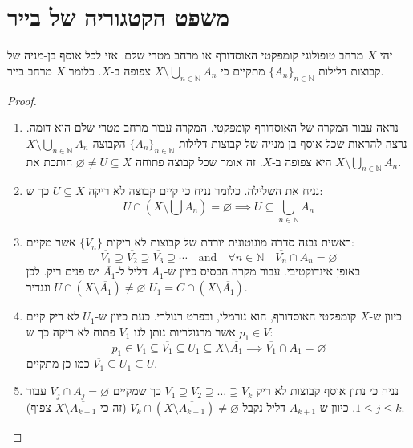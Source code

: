 \documentclass{tstextbook}
\begin{document}
\section{משפט הקטגוריה של בייר}

\begin{theorem}
יהי \(X\) מרחב טופולוגי קומפקטי האוסדורף או מרחב מטרי שלם.
אזי לכל אוסף בן-מניה של קבוצות דלילות \(\{A_{n}\}_{n\in\mathbb{N}}\) מתקיים כי \(X\setminus\bigcup_{n\in\mathbb{N}}A_{n}\) צפופה ב-\(X\). כלומר \(X\) מרחב בייר.

\end{theorem}
\begin{proof}
  \begin{enumerate}
    \item נראה עבור המקרה של האוסדורף קומפקטי. המקרה עבור מרחב מטרי שלם הוא דומה. נרצה להראות שכל אוסף בן מנייה של קבוצות דלילות \(\{ A_{n} \}_{n \in \mathbb{N}}\) הקבוצה \(X \setminus \bigcup_{n \in \mathbb{N}}A_{n}\) היא צפופה ב-\(X\). זה אומר שכל קבוצה פתוחה \(\varnothing \neq U\subseteq X\) חותכת את \(X\setminus \bigcup_{n \in \mathbb{N}}A_{n}\).  


    \item נניח את השלילה. כלומר נניח כי קיים קבוצה לא ריקה \(U\subseteq X\) כך ש: 
$$U\cap\left(X\setminus\bigcup A_{n}\right)=\varnothing \implies U\subseteq \bigcup_{n \in \mathbb{N}} A_{n} $$


    \item ראשית נבנה סדרה מונוטונית יורדת של קבוצות לא ריקות \(\{ V_{n} \}\) אשר מקיים: 
$$\overline{{{V_{1}}}}\supseteq\overline{{{V_{2}}}}\supseteq\overline{{{V_{3}}}}\supseteq\cdots \quad \text{and}\quad \forall n \in \mathbb{N}\quad \overline{V_{n}}\cap A_{n}= \varnothing$$
באופן אינדוקטיבי. עבור מקרה הבסיס כיוון ש-\(A_{1}\) דליל ל-\(\overline{A_{1}}\) יש פנים ריק. לכן \(U\cap \left( X \setminus  \overline{A_{1}}  \right)\neq \varnothing\) ונגדיר \(U_{1}=C\cap \left( X \setminus \overline{A_{1}} \right)\).


    \item כיוון ש-\(X\) קומפקטי האוסדורף, הוא נורמלי, ובפרט רגולרי. כעת כיוון ש-\(U_{1}\) לא ריק קיים \(p_{1} \in V\) אשר מרגולריות נותן לנו \(V_{1}\) פתוח לא ריקה כך ש: 
$$p_{1}\in V_{1}\subseteq\overline{{{V_{1}}}}\subseteq U_{1}\subseteq X\setminus\overline{{{A_{1}}}}\implies\overline{{{V_{1}}}}\cap A_{1}=\varnothing$$
כמו כן מתקיים \(\overline{V_{1}}\subseteq U_{1}\subseteq U\).


    \item נניח כי נתון אוסף קבוצות לא ריק \(V_{1}\supseteq V_{2} \supseteq \dots \supseteq V_{k}\) כך שמקיים \(\overline{V_{j}}\cap A_{j}=\varnothing\) עבור \(1\leq j\leq k\). כיוון ש-\(A_{k+1}\) דליל נקבל \(V_{k}\cap\left(X\setminus{\overline{{A_{k+1}}}}\right)\neq \varnothing\) (זה כי \(X\setminus \overline{A_{k+1}}\) צפוף). 



\end{enumerate}
\end{proof}
\end{document}
